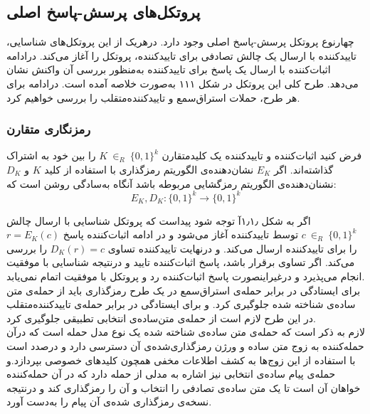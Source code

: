 \subsection{پروتکل‌های پرسش-پاسخ اصلی  }\label{ch_resp_protocol}

چهارنوع پروتکل پرسش-پاسخ اصلی وجود دارد. درهریک از این پروتکل‌های شناسایی، تاییدکننده با ارسال یک چالش تصادفی برای تاییدکننده، پروتکل را آغاز می‌کند. درادامه اثبات‌کننده با ارسال یک پاسخ برای تاییدکننده به‌منظور بررسی آن واکنش نشان می‌دهد. طرح کلی این پروتکل در شکل ۱۱۱ به‌صورت خلاصه آمده است.
درادامه برای هر طرح، حملات استراق‌سمع و تاییدکننده‌متقلب را بررسی خواهیم کرد. 


\subsubsection{رمزنگاری متقارن }\label{symmetric_encrypt}

فرض کنید اثبات‌کننده و تاییدکننده  یک کلیدمتقارن
$K ~{\in}_R ~ \{0,1\}^k $
را بین خود به اشتراک گذاشته‌اند. اگر
$E_K$
نشان‌دهنده‌ی الگوریتم رمزگذاری با استفاده از کلید 
$K$
و
$D_K$
نشنان‌دهنده‌ی الگوریتم رمزگشایی مربوطه باشد آنگاه به‌سادگی روشن است که:
$$E_K,D_K : \{0,1\}^k \rightarrow \{0,1\}^k$$

اگر به شکل ۱٫۱٫آ توجه شود پیداست که پروتکل شناسایی با ارسال چالش
$c ~{\in}_R ~ \{0,1\}^k$
توسط تاییدکننده آغاز می‌شود و در ادامه اثبات‌کننده پاسخ
$r = E_K(c)$
را برای تاییدکننده ارسال می‌کند. و درنهایت تاییدکننده تساوی
$D_K(r) = c$
را بررسی می‌کند. اگر تساوی برقرار باشد، پاسخ اثبات‌کننده تایید و درنتیجه شناسایی با موفقیت انجام می‌پذیرد و درغیراینصورت پاسخ اثبات‌کننده رد و پروتکل با موفقیت اتمام نمی‌یابد.
\\



برای ایستادگی در برابر حمله‌ی استراق‌سمع در یک طرح رمزگذاری باید از حمله‌ی متن ساده‌ی شناخته شده 
جلوگیری کرد. و برای  ایستادگی در برابر حمله‌ی تاییدکننده‌متقلب در این طرح لازم است از حمله‌ی متن‌ساده‌ی انتخابی
 تطبیقی جلوگیری کرد.
\\
 لازم به ذکر است که ‌حمله‌ی متن ساده‌ی شناخته شده یک نوع مدل حمله است که درآن حمله‌کننده به زوج متن ساده و ورژن رمزگذاری‌شده‌ی آن  دسترسی  دارد  و درصدد است با استفاده از  این زوج‌ها به کشف اطلاعات مخفی همچون کلیدهای خصوصی بپردازد.و حمله‌ی پیام ساده‌ی انتخابی نیز اشاره به مدلی از حمله دارد که در آن حمله‌کننده خواهان آن است تا یک متن ساده‌ی تصادفی را انتخاب و آن را رمزگذاری کند و درنتیجه نسخه‌ی 
رمزگذاری شده‌ی آن پیام را به‌دست آورد.

